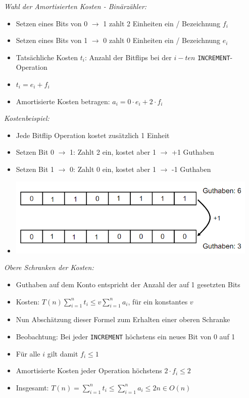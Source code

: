 \documentclass[
    ngerman,
    color=3b,
    dark_mode,
    load_common, %
    summary,
    boxarc,
]{tuda_summary}
\begin{document}
\textit{Wahl der Amortisierten Kosten - Binärzähler:}
          \begin{itemize}
              \item Setzen eines Bits von 0 $\rightarrow$ 1 zahlt 2 Einheiten ein / Bezeichnung $f_i$
              \item Setzen eines Bits von 1 $\rightarrow$ 0 zahlt 0 Einheiten ein / Bezeichnung $e_i$
              \item Tatsächliche Kosten $t_i$: Anzahl der Bitflips bei der $i-ten$ \texttt{INCREMENT}-Operation
              \item[] $t_i = e_i + f_i$
              \item Amortisierte Kosten betragen: $a_i = 0 \cdot e_i + 2 \cdot f_i$
          \end{itemize}

\textit{Kostenbeispiel:}
          \begin{itemize}
              \item Jede Bitflip Operation kostet zusätzlich 1 Einheit
              \item Setzen Bit 0 $\rightarrow$ 1: Zahlt 2 ein, kostet aber 1 $\rightarrow$ +1 Guthaben
              \item Setzen Bit 1 $\rightarrow$ 0: Zahlt 0 ein, kostet aber 1 $\rightarrow$ -1 Guthaben
              \item[] \includegraphics[width=12cm]{pictures/guthaben.PNG}
          \end{itemize}

\textit{Obere Schranken der Kosten:}
          \begin{itemize}
              \item Guthaben auf dem Konto entspricht der Anzahl der auf 1 gesetzten Bits
              \item Kosten: $T(n) \sum^n_{i=1} t_i \leq v\sum^n_{i=1} a_i$, für ein konstantes $v$
              \item Nun Abschätzung dieser Formel zum Erhalten einer oberen Schranke
              \item Beobachtung: Bei jeder \texttt{INCREMENT} höchstens ein neues Bit von 0 auf 1
              \item Für alle $i$ gilt damit $f_i \leq 1$
              \item Amortisierte Kosten jeder Operation höchstens $2 \cdot f_i \leq 2$
              \item Insgesamt: $T(n) = \sum^n_{i=1} t_i \leq \sum^n_{i=1} a_i \leq 2n \in O(n)$
          \end{itemize}
\end{document}
